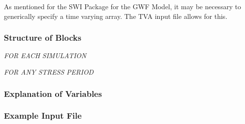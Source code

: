 As mentioned for the SWI Package for the GWF Model, it may be necessary to generically specify a time varying array.  The TVA input file allows for this.  

\vspace{5mm}
\subsubsection{Structure of Blocks}
\vspace{5mm}

\noindent \textit{FOR EACH SIMULATION}

\vspace{5mm}
\noindent \textit{FOR ANY STRESS PERIOD}


\vspace{5mm}
\subsubsection{Explanation of Variables}
\begin{description}

\end{description}

\subsubsection{Example Input File}
